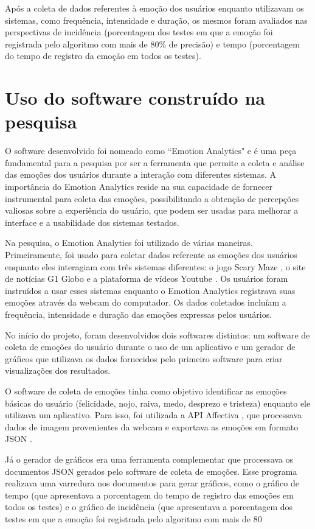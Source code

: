 Após a coleta de dados referentes à emoção dos usuários enquanto utilizavam os sistemas, como frequência, intensidade e duração, os mesmos foram avaliados nas perspectivas de incidência (porcentagem dos testes em que a emoção foi registrada pelo algoritmo com mais de 80\% de precisão) e tempo (porcentagem do tempo de registro da emoção em todos os testes).

\section{Uso do software construído na pesquisa}

O software desenvolvido foi nomeado como “Emotion Analytics" e é uma peça fundamental para a pesquisa por ser a ferramenta que permite a coleta e análise das emoções dos usuários durante a interação com diferentes sistemas. A importância do Emotion Analytics reside na sua capacidade de fornecer instrumental para coleta das emoções, possibilitando a obtenção de percepções valiosas sobre a experiência do usuário, que podem ser usadas para melhorar a interface e a usabilidade dos sistemas testados.

Na pesquisa, o Emotion Analytics foi utilizado de várias maneiras. Primeiramente, foi usado para coletar dados referente as emoções dos usuários enquanto eles interagiam com três sistemas diferentes: o jogo Scary Maze \cite{18}, o site de notícias G1 Globo \cite{19} e a plataforma de vídeos Youtube \cite{20}. Os usuários foram instruídos a usar esses sistemas enquanto o Emotion Analytics registrava suas emoções através da webcam do computador. Os dados coletados incluíam a frequência, intensidade e duração das emoções expressas pelos usuários.

No início do projeto, foram desenvolvidos dois softwares distintos: um software de coleta de emoções do usuário durante o uso de um aplicativo e um gerador de gráficos que utilizava os dados fornecidos pelo primeiro software para criar visualizações dos resultados.

O software de coleta de emoções tinha como objetivo identificar as emoções básicas do usuário (felicidade, nojo, raiva, medo, desprezo e tristeza) \cite{5} enquanto ele utilizava um aplicativo. Para isso, foi utilizada a API Affectiva \cite{8}, que processava dados de imagem provenientes da webcam e exportava as emoções em formato JSON \cite{21}.

Já o gerador de gráficos era uma ferramenta complementar que processava os documentos JSON \cite{21} gerados pelo software de coleta de emoções. Esse programa realizava uma varredura nos documentos para gerar gráficos, como o gráfico de tempo (que apresentava a porcentagem do tempo de registro das emoções em todos os testes) e o gráfico de incidência (que apresentava a porcentagem dos testes em que a emoção foi registrada pelo algoritmo com mais de 80%

